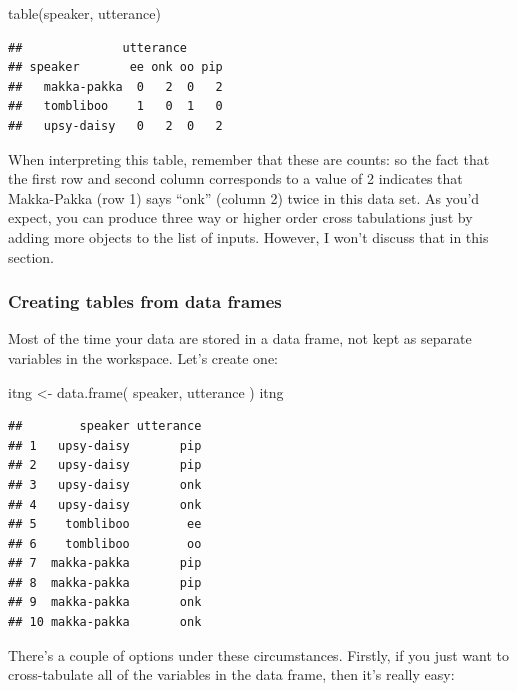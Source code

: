 \documentclass[
]{book}
\newenvironment{Shaded}{\begin{snugshade}}{\end{snugshade}}
\newcommand{\FunctionTok}[1]{\textcolor[rgb]{0.00,0.00,0.00}{#1}}
\newcommand{\NormalTok}[1]{#1}
\newcommand{\OtherTok}[1]{\textcolor[rgb]{0.56,0.35,0.01}{#1}}
\begin{document}
\begin{Shaded}
\begin{Highlighting}[]
\FunctionTok{table}\NormalTok{(speaker, utterance)}
\end{Highlighting}
\end{Shaded}

\begin{verbatim}
##              utterance
## speaker       ee onk oo pip
##   makka-pakka  0   2  0   2
##   tombliboo    1   0  1   0
##   upsy-daisy   0   2  0   2
\end{verbatim}

When interpreting this table, remember that these are counts: so the fact that the first row and second column corresponds to a value of 2 indicates that Makka-Pakka (row 1) says ``onk'' (column 2) twice in this data set. As you'd expect, you can produce three way or higher order cross tabulations just by adding more objects to the list of inputs. However, I won't discuss that in this section.

\hypertarget{creating-tables-from-data-frames}{%
\subsubsection{Creating tables from data frames}\label{creating-tables-from-data-frames}}

Most of the time your data are stored in a data frame, not kept as separate variables in the workspace. Let's create one:

\begin{Shaded}
\begin{Highlighting}[]
\NormalTok{itng }\OtherTok{\textless{}{-}} \FunctionTok{data.frame}\NormalTok{( speaker, utterance )}
\NormalTok{itng}
\end{Highlighting}
\end{Shaded}

\begin{verbatim}
##        speaker utterance
## 1   upsy-daisy       pip
## 2   upsy-daisy       pip
## 3   upsy-daisy       onk
## 4   upsy-daisy       onk
## 5    tombliboo        ee
## 6    tombliboo        oo
## 7  makka-pakka       pip
## 8  makka-pakka       pip
## 9  makka-pakka       onk
## 10 makka-pakka       onk
\end{verbatim}

There's a couple of options under these circumstances. Firstly, if you just want to cross-tabulate all of the variables in the data frame, then it's really easy:
\end{document}
